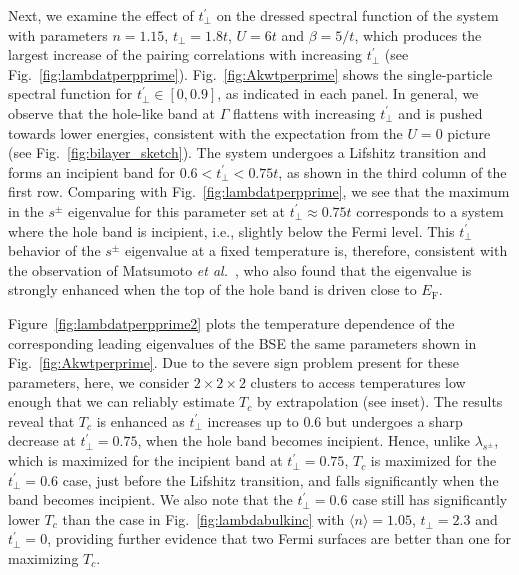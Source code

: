 \documentclass[prb,twocolumn,amsmath,amssymb,superscriptaddress,floatfix,nofootinbib]{revtex4-2}
\begin{document}
Next, we examine the effect of $t_\perp^{\prime}$ on the dressed spectral function of the system with parameters $n=1.15$, $t_\perp=1.8t$, $U=6t$ and $\beta=5/t$, which produces the largest increase of the pairing correlations with increasing $t_\perp^{\prime}$ (see Fig.~\ref{fig:lambdatperpprime}).  Fig.~\ref{fig:Akwtperprime} shows the single-particle spectral function for $t_\perp^{\prime} \in [0,0.9]$, as indicated in each panel. In general, we observe that the hole-like band at $\Gamma$ flattens with increasing $t^\prime_\perp$ and is pushed towards lower energies, consistent with the expectation from the $U=0$ picture (see Fig.~\ref{fig:bilayer_sketch}). The system undergoes a Lifshitz transition and forms an incipient band for $0.6 < t_\perp^{\prime} <0.75t$, as shown in the third column of the first row. Comparing with Fig.~\ref{fig:lambdatperpprime}, we see that the maximum in the $s^\pm$ eigenvalue for this parameter set at $t_\perp^\prime \approx 0.75t$ corresponds to a system where the hole band is incipient, i.e., slightly below the Fermi level. This $t_\perp^\prime$ behavior of the $s^\pm$ eigenvalue at a fixed temperature is, therefore, consistent with the observation of Matsumoto {\it et al.}~\cite{KurokiFlex2020}, who also found that the eigenvalue is strongly enhanced when the top of the hole band is driven close to $E_\mathrm{F}$. 

Figure~\ref{fig:lambdatperpprime2} plots the temperature dependence of the corresponding leading eigenvalues of the BSE the same parameters shown in Fig.~\ref{fig:Akwtperprime}. Due to the severe sign problem present for these parameters, here, we consider $2\times 2\times 2$ clusters to access temperatures low enough that we can reliably estimate $T_c$ by extrapolation (see inset). The results reveal that $T_c$ is enhanced as $t_\perp^{\prime}$ increases up to $0.6$ but undergoes a sharp decrease at $t_\perp^{\prime} = 0.75$, when the hole band becomes incipient. Hence, unlike $\lambda_{s^\pm}$, which is maximized for the incipient band at $t_\perp^\prime=0.75$, $T_c$ is maximized for the $t_\perp^\prime=0.6$ case, just before the Lifshitz transition, and falls significantly when the band becomes incipient. We also note that the $t_\perp^\prime=0.6$ case still has significantly lower $T_c$ than the case in Fig.~\ref{fig:lambdabulkinc} with $\langle n\rangle=1.05$, $t^{\phantom\prime}_\perp=2.3$ and $t_\perp^\prime=0$, providing further evidence that two Fermi surfaces are better than one for maximizing $T_c$. 

\end{document}
